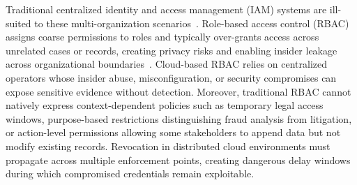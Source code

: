 \documentclass[pdflatex,sn-mathphys-num]{sn-jnl}
\begin{document}

Traditional centralized identity and access management (IAM) systems are ill-suited to these multi-organization scenarios~\cite{krishna2023ssh}. Role-based access control (RBAC) assigns coarse permissions to roles and typically over-grants access across unrelated cases or records, creating privacy risks and enabling insider leakage across organizational boundaries~\cite{Sekar, krishna2023ssh}. Cloud-based RBAC relies on centralized operators whose insider abuse, misconfiguration, or security compromises can expose sensitive evidence without detection. Moreover, traditional RBAC cannot natively express context-dependent policies such as temporary legal access windows, purpose-based restrictions distinguishing fraud analysis from litigation, or action-level permissions allowing some stakeholders to append data but not modify existing records. Revocation in distributed cloud environments must propagate across multiple enforcement points, creating dangerous delay windows during which compromised credentials remain exploitable.
\end{document}
